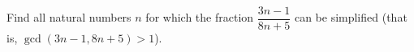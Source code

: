 Find all natural numbers $n$ for which the fraction $\dfrac{3n-1}{8n+5}$ can be simplified (that is, $\gcd(3n-1,8n+5)>1$).
